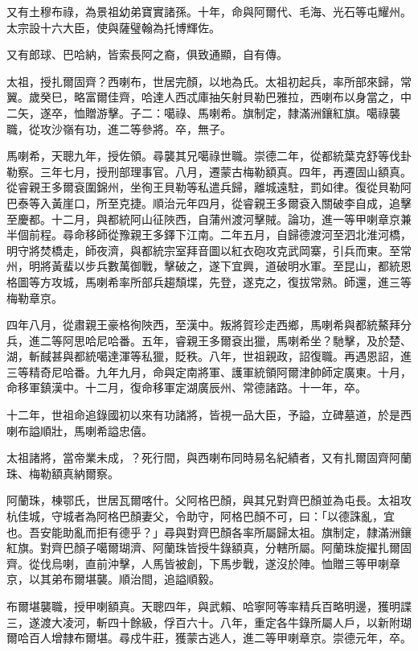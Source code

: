 \begin{pinyinscope}
又有土穆布祿，為景祖幼弟寶實諸孫。十年，命與阿爾代、毛海、光石等屯耀州。太宗設十六大臣，使與薩璧翰為托博輝佐。

又有郎球、巴哈納，皆索長阿之裔，俱致通顯，自有傳。

太祖，授扎爾固齊？西喇布，世居完顏，以地為氏。太祖初起兵，率所部來歸，常翼。歲癸巳，略富爾佳齊，哈達人西忒庫抽矢射貝勒巴雅拉，西喇布以身當之，中二矢，遂卒，恤贈游擊。子二：噶祿、馬喇希。旗制定，隸滿洲鑲紅旗。噶祿襲職，從攻沙嶺有功，進二等參將。卒，無子。

馬喇希，天聰九年，授佐領。尋襲其兄噶祿世職。崇德二年，從都統葉克舒等伐卦勒察。三年七月，授刑部理事官。八月，遷蒙古梅勒額真。四年，再遷固山額真。從睿親王多爾袞圍錦州，坐徇王貝勒等私遣兵歸，離城遠駐，罰如律。復從貝勒阿巴泰等入黃崖口，所至克捷。順治元年四月，從睿親王多爾袞入關破李自成，追擊至慶都。十二月，與都統阿山征陜西，自蒲州渡河擊賊。論功，進一等甲喇章京兼半個前程。尋命移師從豫親王多鐸下江南。二年五月，自歸德渡河至泗北淮河橋，明守將焚橋走，師夜濟，與都統宗室拜音圖以紅衣砲攻克武岡寨，引兵而東。至常州，明將黃蜚以步兵數萬御戰，擊破之，遂下宜興，道破明水軍。至昆山，都統恩格圖等方攻城，馬喇希率所部兵趨頹堞，先登，遂克之，復拔常熟。師還，進三等梅勒章京。

四年八月，從肅親王豪格徇陜西，至漢中。叛將賀珍走西鄉，馬喇希與都統鰲拜分兵，進二等阿思哈尼哈番。五年，睿親王多爾袞出獵，馬喇希坐？馳擊，及於楚、湖，斬馘甚與都統噶達渾等私獵，貶秩。八年，世祖親政，詔復職。再遇恩詔，進三等精奇尼哈番。九年九月，命與定南將軍、護軍統領阿爾津帥師定廣東。十月，命移軍鎮漢中。十二月，復命移軍定湖廣辰州、常德諸路。十一年，卒。

十二年，世祖命追錄國初以來有功諸將，皆視一品大臣，予謚，立碑墓道，於是西喇布謚順壯，馬喇希謚忠僖。

太祖諸將，當帝業未成，？死行間，與西喇布同時易名紀績者，又有扎爾固齊阿蘭珠、梅勒額真納爾察。

阿蘭珠，棟鄂氏，世居瓦爾喀什。父阿格巴顏，與其兄對齊巴顏並為屯長。太祖攻杭佳城，守城者為阿格巴顏妻父，令助守，阿格巴顏不可，曰：「以德誅亂，宜也。吾安能助亂而拒有德乎？」尋與對齊巴顏各率所屬歸太祖。旗制定，隸滿洲鑲紅旗。對齊巴顏子噶爾瑚濟、阿蘭珠皆授牛錄額真，分轄所屬。阿蘭珠旋擢扎爾固齊。從伐烏喇，直前沖擊，人馬皆被創，下馬步戰，遂沒於陣。恤贈三等甲喇章京，以其弟布爾堪襲。順治間，追謚順毅。

布爾堪襲職，授甲喇額真。天聰四年，與武賴、哈寧阿等率精兵百略明邊，獲明諜三，遂渡大凌河，斬四十餘級，俘百六十。八年，重定各牛錄所屬人戶，以新附瑚爾哈百人增隸布爾堪。尋戍牛莊，獲蒙古逃人，進二等甲喇章京。崇德元年，卒。


\end{pinyinscope}

